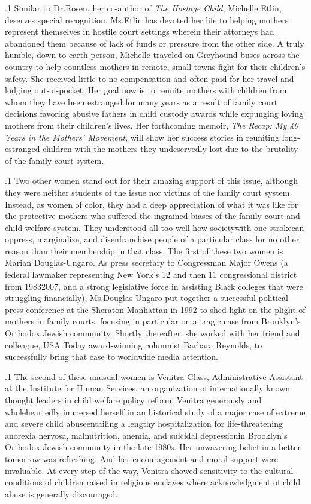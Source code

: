 \documentclass[11pt, twoside]{article}
\begin{document}
{\p.1{%
Similar to Dr.\@ Rosen, her co-author of \textit{The Hostage Child}, Michelle
Etlin, deserves special recognition. Ms.\@ Etlin has devoted her life to helping mothers represent themselves in hostile court settings wherein their
attorneys had abandoned them because of lack of funds or pressure
from the other side. A truly humble, down-to-earth person, Michelle
traveled on Greyhound buses across the country to help countless mothers in remote, small towns fight for their children’s safety. She received
little to no compensation and often paid for her travel and lodging
out-of-pocket. Her goal now is to reunite mothers with children from
whom they have been estranged for many years as a result of family
court decisions favoring abusive fathers in child custody awards while
expunging loving mothers from their children’s lives. Her forthcoming
memoir, \textit{The Recap: My 40 Years in the Mothers’ Movement}, will
show her success stories in reuniting long-estranged children with the
mothers they undeservedly lost due to the brutality of the family court
system.
}%

\p.1{%
Two other women stand out for their amazing support of this issue,
although they were neither students of the issue nor victims of the family
court system. Instead, as women of color, they had a deep appreciation of what it was like for the protective mothers who suffered
the ingrained biases of the family court and child welfare system. They
understood all too well how society\mdash{}with one stroke\mdash{}can oppress,
marginalize, and disenfranchise people of a particular class for no other
reason than their membership in that class.
The first of these two women is Marian Douglas-Ungaro. As press secretary to Congressman Major Owens (a federal lawmaker representing
New York’s 12\nth{} and then 11\nth{} congressional district from 1983\ndash{}2007,
and a strong legislative force in assisting Black colleges that were
struggling financially), Ms.\@ Douglas-Ungaro put together a successful
political press conference at the Sheraton Manhattan in 1992 to shed
light on the plight of mothers in family courts, focusing in particular
on a tragic case from Brooklyn’s Orthodox Jewish community. Shortly
thereafter, she worked with her friend and colleague, USA Today
award-winning columnist Barbara Reynolds, to successfully bring that case to
worldwide media attention.
}%

\p.1{%
The second of these unusual women is Venitra Glass, Administrative
Assistant at the Institute for Human Services, an organization of internationally known thought leaders in child welfare policy reform. Venitra
generously and wholeheartedly immersed herself in an historical study of
a major case of extreme and severe child abuse\mdash{}entailing a lengthy
hospitalization for life-threatening anorexia nervosa, malnutrition, anemia, and
suicidal depression\mdash{}in Brooklyn’s Orthodox Jewish community in the
late 1980s. Her unwavering belief in a better tomorrow was refreshing. And
her encouragement and moral support were invaluable. At every step of
the way, Venitra showed sensitivity to the cultural conditions of children raised in religious enclaves where acknowledgment of child abuse
is generally discouraged.
}%

}
\end{document}
